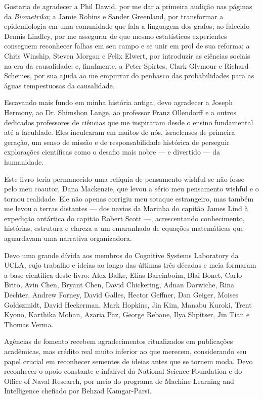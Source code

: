 \documentclass[11pt,a5paper,twoside]{book}
\begin{document}
Gostaria de agradecer a Phil Dawid, por me dar a primeira audição nas páginas da \textit{Biometrika}; a Jamie Robins e Sander Greenland, por transformar a epidemiologia em uma comunidade que fala a linguagem dos grafos; ao falecido Dennis Lindley, por me assegurar de que mesmo estatísticos experientes conseguem reconhecer falhas em seu campo e se unir em prol de sua reforma; a Chris Winship, Steven Morgan e Felix Elwert, por introduzir as ciências sociais na era da causalidade; e, finalmente, a Peter Spirtes, Clark Glymour e Richard Scheines, por sua ajuda ao me empurrar do penhasco das probabilidades para as águas tempestuosas da causalidade.

Escavando mais fundo em minha história antiga, devo agradecer a Joseph Hermony, ao Dr. Shimshon Lange, ao professor Franz Ollendorff e a outros dedicados professores de ciências que me inspiraram desde o ensino fundamental até a faculdade. Eles inculcaram em muitos de nós, israelenses de primeira geração, um senso de missão e de responsabilidade histórica de perseguir explorações científicas como o desafio mais nobre — e divertido — da humanidade.

Este livro teria permanecido uma relíquia de pensamento wishful se não fosse pelo meu coautor, Dana Mackenzie, que levou a sério meu pensamento wishful e o tornou realidade. Ele não apenas corrigiu meu sotaque estrangeiro, mas também me levou a terras distantes — dos navios da Marinha do capitão James Lind à expedição antártica do capitão Robert Scott —, acrescentando conhecimento, histórias, estrutura e clareza a um emaranhado de equações matemáticas que aguardavam uma narrativa organizadora.

Devo uma grande dívida aos membros do Cognitive Systems Laboratory da UCLA, cujo trabalho e ideias ao longo das últimas três décadas e meia formaram a base científica deste livro: Alex Balke, Elias Bareinboim, Blai Bonet, Carlo Brito, Avin Chen, Bryant Chen, David Chickering, Adnan Darwiche, Rina Dechter, Andrew Forney, David Galles, Hector Geffner, Dan Geiger, Moises Goldszmidt, David Heckerman, Mark Hopkins, Jin Kim, Manabu Kuroki, Trent Kyono, Karthika Mohan, Azaria Paz, George Rebane, Ilya Shpitser, Jin Tian e Thomas Verma.

Agências de fomento recebem agradecimentos ritualizados em publicações acadêmicas, mas crédito real muito inferior ao que merecem, considerando seu papel crucial em reconhecer sementes de ideias antes que se tornem moda. Devo reconhecer o apoio constante e infalível da National Science Foundation e do Office of Naval Research, por meio do programa de Machine Learning and Intelligence chefiado por Behzad Kamgar-Parsi.
\end{document}
